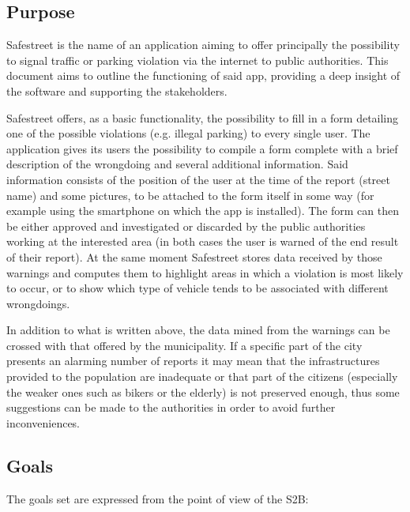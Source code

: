 \subsection{Purpose}

Safestreet is the name of an application aiming to offer principally 
the possibility to signal traffic or parking violation via the internet 
to public authorities.
This document aims to outline the functioning of said app, providing a 
deep insight of the software and supporting the stakeholders.

Safestreet offers, as a basic functionality, the possibility to fill in 
a form detailing one of the possible violations (e.g. illegal parking) 
to every single user. The application gives its users the possibility 
to compile a form complete with a brief description of the wrongdoing 
and several additional information. Said information consists of the 
position of the user at the time of the report (street name) and some 
pictures, to be attached to the form itself in some way (for example 
using the smartphone on which the app is installed). The form can then 
be either approved and investigated or discarded by the public authorities 
working at the interested area (in both cases the user is warned of the end 
result of their report). At the same moment Safestreet stores data received 
by those warnings and computes them to highlight areas in which a violation 
is most likely to occur, or to show which type of vehicle tends to be 
associated with different wrongdoings.

In addition to what is written above, the data mined from the warnings 
can be crossed with that offered by the municipality. If a specific part 
of the city presents an alarming number of reports it may mean that the 
infrastructures provided to the population are inadequate or that part 
of the citizens (especially the weaker ones such as bikers or the elderly) 
is not preserved enough, thus some suggestions can be made to the authorities 
in order to avoid further inconveniences.

\subsection{Goals}

The goals set are expressed from the point of view of the S2B:

